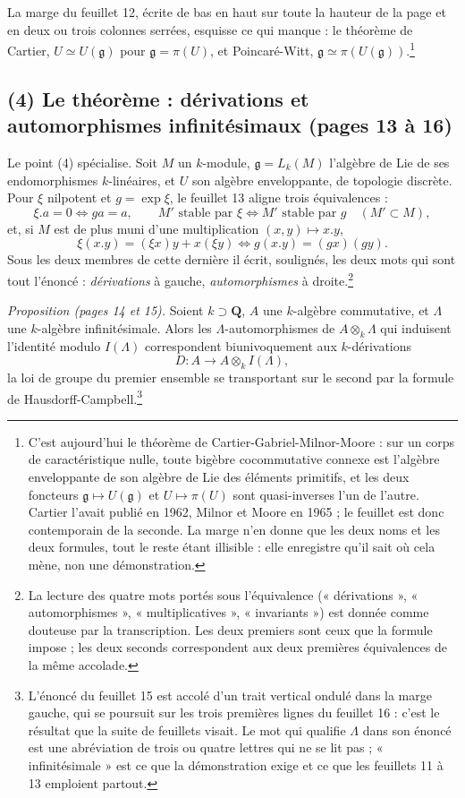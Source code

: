 \documentclass[11pt,a4paper]{article}
\begin{document}
La marge du feuillet 12, écrite de bas en haut sur toute la hauteur de la page
et en deux ou trois colonnes serrées, esquisse ce qui manque : le théorème de
Cartier, $U \simeq U(\mathfrak{g})$ pour $\mathfrak{g} = \pi(U)$, et
Poincaré-Witt, $\mathfrak{g} \simeq \pi(U(\mathfrak{g}))$.\footnote{C'est
aujourd'hui le théorème de Cartier-Gabriel-Milnor-Moore : sur un corps de
caractéristique nulle, toute bigèbre cocommutative connexe est l'algèbre
enveloppante de son algèbre de Lie des éléments primitifs, et les deux foncteurs
$\mathfrak{g} \mapsto U(\mathfrak{g})$ et $U \mapsto \pi(U)$ sont quasi-inverses
l'un de l'autre. Cartier l'avait publié en 1962, Milnor et Moore en 1965 ; le
feuillet est donc contemporain de la seconde. La marge n'en donne que les deux
noms et les deux formules, tout le reste étant illisible : elle enregistre
qu'il sait où cela mène, non une démonstration.}

\subsection*{(4) Le théorème : dérivations et automorphismes infinitésimaux (pages 13 à 16)}

Le point (4) spécialise. Soit $M$ un $k$-module, $\mathfrak{g} = L_k(M)$
l'algèbre de Lie de ses endomorphismes $k$-linéaires, et $U$ son algèbre
enveloppante, de topologie discrète. Pour $\xi$ nilpotent et $g = \exp \xi$, le
feuillet 13 aligne trois équivalences :
\[
  \xi . a = 0 \iff g a = a ,
  \qquad
  M' \text{ stable par } \xi \iff M' \text{ stable par } g
  \quad (M' \subset M) ,
\]
et, si $M$ est de plus muni d'une multiplication $(x,y) \mapsto x . y$,
\[
  \xi(x . y) = (\xi x) y + x (\xi y)
  \iff
  g(x . y) = (g x)(g y) .
\]
Sous les deux membres de cette dernière il écrit, soulignés, les deux mots qui
sont tout l'énoncé : \emph{dérivations} à gauche, \emph{automorphismes} à
droite.\footnote{La lecture des quatre mots portés sous l'équivalence
(« dérivations », « automorphismes », « multiplicatives », « invariants ») est
donnée comme douteuse par la transcription. Les deux premiers sont ceux que la
formule impose ; les deux seconds correspondent aux deux premières
équivalences de la même accolade.}

\emph{Proposition (pages 14 et 15).} Soient $k \supset \mathbf{Q}$, $A$ une
$k$-algèbre commutative, et $\Lambda$ une $k$-algèbre infinitésimale. Alors les
$\Lambda$-automorphismes de $A \otimes_{k} \Lambda$ qui induisent l'identité
modulo $I(\Lambda)$ correspondent biunivoquement aux $k$-dérivations
\[
  D : A \longrightarrow A \otimes_{k} I(\Lambda) ,
\]
la loi de groupe du premier ensemble se transportant sur le second par la
formule de Hausdorff-Campbell.\footnote{L'énoncé du feuillet 15 est accolé d'un
trait vertical ondulé dans la marge gauche, qui se poursuit sur les trois
premières lignes du feuillet 16 : c'est le résultat que la suite de feuillets
visait. Le mot qui qualifie $\Lambda$ dans son énoncé est une abréviation de
trois ou quatre lettres qui ne se lit pas ; « infinitésimale » est ce que la
démonstration exige et ce que les feuillets 11 à 13 emploient partout.}
\end{document}
